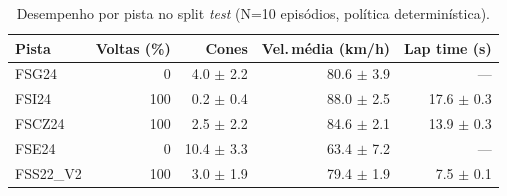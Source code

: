 \begin{table}[H]
\centering
\caption{Desempenho por pista no split \textit{test} (N=10 episódios, política determinística).}
\label{tab:per_track_test}
\begin{tabular}{lrrrr}
\toprule
\textbf{Pista} & \textbf{Voltas (\%)} & \textbf{Cones} & \textbf{Vel.\,m\'edia (km/h)} & \textbf{Lap time (s)} \\
\midrule
FSG24 & 0 & 4.0 $\pm$ 2.2 & 80.6 $\pm$ 3.9 & --- \\
FSI24 & 100 & 0.2 $\pm$ 0.4 & 88.0 $\pm$ 2.5 & 17.6 $\pm$ 0.3 \\
FSCZ24 & 100 & 2.5 $\pm$ 2.2 & 84.6 $\pm$ 2.1 & 13.9 $\pm$ 0.3 \\
FSE24 & 0 & 10.4 $\pm$ 3.3 & 63.4 $\pm$ 7.2 & --- \\
FSS22_V2 & 100 & 3.0 $\pm$ 1.9 & 79.4 $\pm$ 1.9 & 7.5 $\pm$ 0.1 \\
\bottomrule
\end{tabular}
\end{table}
